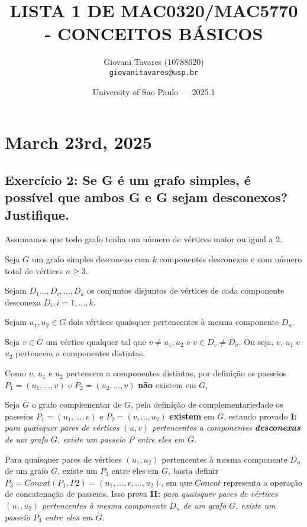 \documentclass{article}
\title{LISTA 1 DE MAC0320/MAC5770 - CONCEITOS BÁSICOS} %
\author{Giovani Tavares (10788620)\\ \texttt{giovanitavares@usp.br}} %
\date{University of Sao Paulo --- 2025.1} %
\begin{document}
\maketitle %


\section{March 23rd, 2025} %

\subsection{Exercício 2: Se G é um grafo simples, é possível que ambos G e G sejam desconexos? Justifique.}


Assumamos que todo grafo tenha um número de vértices maior ou igual a $2$. 

Seja $G$ um grafo simples desconexo com $k$ componentes desconexas e com número total de vértices $n \geq 3$.  

Sejam $D_1 ..., D_i, ..., D_k$ os conjuntos disjuntos de vértices de cada componente desconexa $D_i , i = 1, ..., k$.

Sejam $u_1, u_2 \in G$ dois vértices quaisquer pertencentes à mesma componente $D_u$.

Seja $v \in G$ um vértice qualquer tal que $v \neq u_1, u_2$ e $v \in D_v \neq D_u$. Ou seja, $v$, $u_1$ e $u_2$ pertencem a componentes distintas.

Como $v$, $u_1$ e $u_2$ pertencem a componentes distintas, por definição os passeios $P_1 = (u_1, ..., v)$ e $P_2 = (u_2, ..., v)$ \textbf{não} existem em $G$,

Seja $\bar{G}$ o grafo complementar de $G$, pela definição de complementariedade os passeios $P_1 = (u_1, ..., v)$ e $P_2 = (v, ..., u_2)$ \textbf{existem} em $\bar{G}$, estando provado \textbf{I: } \textit{para quaisquer pares de vértices $(u, v)$ pertencentes a componentes \textbf{desconexas} de um grafo $G$, existe um passeio $P$ entre eles em $\bar{G}$.}

Para quaisquer pares de vértices $(u_1, u_2)$ pertencentes à mesma componente $D_u$ de um grafo $G$, existe um $P_3$ entre eles em $\bar{G}$, basta definir $P_3 = Concat(P_1, P2) = (u_1, ..., v, ..., u_2)$, em que $Concat$ representa a operação de concatenação de passeios. Isso prova \textbf{II: } \textit{para quaisquer pares de vértices $(u_1, u_2)$ pertencentes à mesma componente $D_u$ de um grafo $G$, existe um passeio $P_3$ entre eles em $\bar{G}$.}
\end{document}
